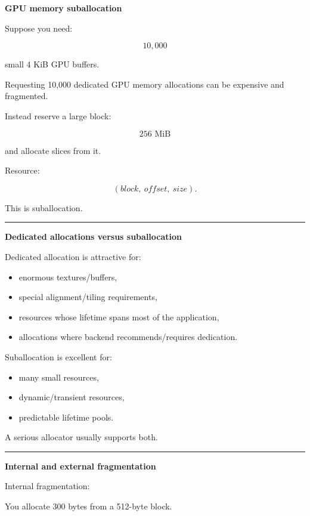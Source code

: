 \textbf{GPU memory suballocation}

Suppose you need:

\[
10,000
\]

small 4 KiB GPU buffers.

Requesting 10,000 dedicated GPU memory allocations can be expensive and fragmented.

Instead reserve a large block:

\[
256\text{ MiB}
\]

and allocate slices from it.

Resource:

\[
(block,\ offset,\ size).
\]

This is suballocation.

\begin{center}\rule{0.5\linewidth}{0.5pt}\end{center}

\textbf{Dedicated allocations versus suballocation}

Dedicated allocation is attractive for:

\begin{itemize}
\tightlist
\item
  enormous textures/buffers,
\item
  special alignment/tiling requirements,
\item
  resources whose lifetime spans most of the application,
\item
  allocations where backend recommends/requires dedication.
\end{itemize}

Suballocation is excellent for:

\begin{itemize}
\tightlist
\item
  many small resources,
\item
  dynamic/transient resources,
\item
  predictable lifetime pools.
\end{itemize}

A serious allocator usually supports both.

\begin{center}\rule{0.5\linewidth}{0.5pt}\end{center}

\textbf{Internal and external fragmentation}

Internal fragmentation:

You allocate 300 bytes from a 512-byte block.

